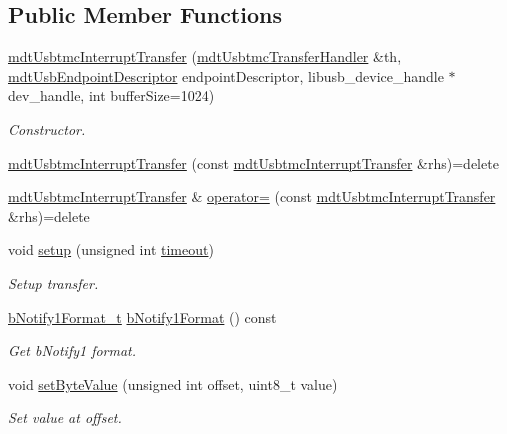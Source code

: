 \subsection*{Public Member Functions}
\begin{DoxyCompactItemize}
\item 
\hyperlink{classmdt_usbtmc_interrupt_transfer_a214442becfb3eea23165bfb1db5efe89}{mdt\-Usbtmc\-Interrupt\-Transfer} (\hyperlink{classmdt_usbtmc_transfer_handler}{mdt\-Usbtmc\-Transfer\-Handler} \&th, \hyperlink{classmdt_usb_endpoint_descriptor}{mdt\-Usb\-Endpoint\-Descriptor} endpoint\-Descriptor, libusb\-\_\-device\-\_\-handle $\ast$dev\-\_\-handle, int buffer\-Size=1024)
\begin{DoxyCompactList}\small\item\em Constructor. \end{DoxyCompactList}\item 
\hyperlink{classmdt_usbtmc_interrupt_transfer_aa5f4e2f1eb4aae50cb5ee11e57aa7d98}{mdt\-Usbtmc\-Interrupt\-Transfer} (const \hyperlink{classmdt_usbtmc_interrupt_transfer}{mdt\-Usbtmc\-Interrupt\-Transfer} \&rhs)=delete
\item 
\hyperlink{classmdt_usbtmc_interrupt_transfer}{mdt\-Usbtmc\-Interrupt\-Transfer} \& \hyperlink{classmdt_usbtmc_interrupt_transfer_a43499fd0823d973cb056e0ed8a4bab4e}{operator=} (const \hyperlink{classmdt_usbtmc_interrupt_transfer}{mdt\-Usbtmc\-Interrupt\-Transfer} \&rhs)=delete
\item 
void \hyperlink{classmdt_usbtmc_interrupt_transfer_ab26c6b3f64fb34205827cc1e1d887ab8}{setup} (unsigned int \hyperlink{classmdt_usb_transfer_a3262511f6062348132e7ee689c24226c}{timeout})
\begin{DoxyCompactList}\small\item\em Setup transfer. \end{DoxyCompactList}\item 
\hyperlink{classmdt_usbtmc_interrupt_transfer_ae547608f6ca182cc8312a8f4cbf8b2f1}{b\-Notify1\-Format\-\_\-t} \hyperlink{classmdt_usbtmc_interrupt_transfer_a795279af783b45ae6356e4974e56790d}{b\-Notify1\-Format} () const 
\begin{DoxyCompactList}\small\item\em Get b\-Notify1 format. \end{DoxyCompactList}\item 
void \hyperlink{classmdt_usbtmc_interrupt_transfer_af9e4bfa56a1a47fcf27b3df6e5a06e2d}{set\-Byte\-Value} (unsigned int offset, uint8\-\_\-t value)
\begin{DoxyCompactList}\small\item\em Set value at offset. \end{DoxyCompactList}\item 

\end{DoxyCompactItemize}
